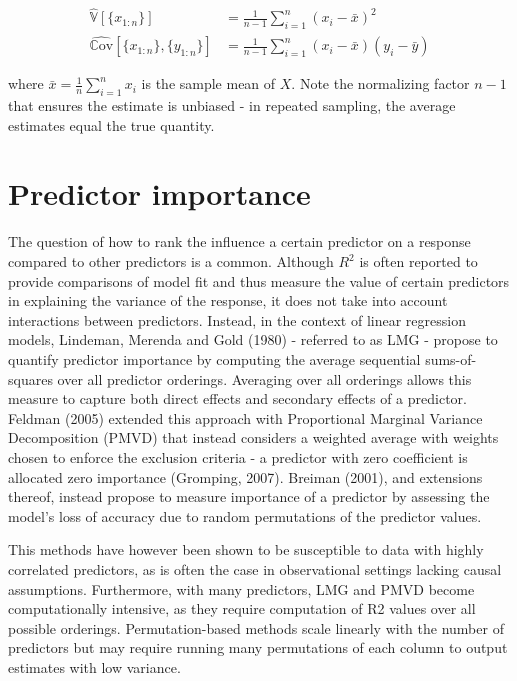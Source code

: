 \documentclass[11pt,a4paper,twoside,openright]{report}
\theoremstyle{definition}
\begin{document}
\begin{equation}
\begin{aligned}
\hat{\mathbb{V}}[\{x_{1:n}\}] &= \frac{1}{n-1} \sum_{i=1}^n \left( x_i - \bar{x} \right)^2 \\
\hat{\mathbb{C}\text{ov}}[\{x_{1:n}\},\{y_{1:n}\}] &= \frac{1}{n-1} \sum_{i=1}^n ( x_i - \bar{x})(y_i - \bar{y})
\end{aligned}
\label{eq:samplevar}
\end{equation}

where \(\bar{x} = \frac{1}{n} \sum_{i=1}^{n} x_i\) is the sample mean of \(X\). Note the normalizing factor \(n-1\) that ensures the estimate is unbiased - in repeated sampling, the average estimates equal the true quantity.

\section{Predictor importance}\label{predictor-importance}

The question of how to rank the influence a certain predictor on a response compared to other predictors is a common. Although \(R^2\) is often reported to provide comparisons of model fit and thus measure the value of certain predictors in explaining the variance of the response, it does not take into account interactions between predictors. Instead, in the context of linear regression models, Lindeman, Merenda and Gold (1980) - referred to as LMG - propose to quantify predictor importance by computing the average sequential sums-of-squares over all predictor orderings. Averaging over all orderings allows this measure to capture both direct effects and secondary effects of a predictor. Feldman (2005) extended this approach with Proportional Marginal Variance Decomposition (PMVD) that instead considers a weighted average with weights chosen to enforce the exclusion criteria - a predictor with zero coefficient is allocated zero importance (Gromping, 2007). Breiman (2001), and extensions thereof, instead propose to measure importance of a predictor by assessing the model's loss of accuracy due to random permutations of the predictor values.

This methods have however been shown to be susceptible to data with highly correlated predictors, as is often the case in observational settings lacking causal assumptions. Furthermore, with many predictors, LMG and PMVD become computationally intensive, as they require computation of R2 values over all possible orderings. Permutation-based methods scale linearly with the number of predictors but may require running many permutations of each column to output estimates with low variance.
\end{document}
